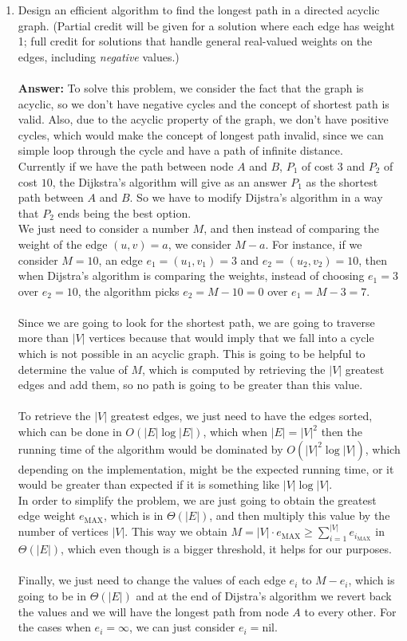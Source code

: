 \documentclass[12pt]{scrartcl}
\begin{document}
\begin{enumerate}
	\item Design an efficient algorithm to find the longest path in a directed acyclic graph. (Partial credit will be given for a solution where each edge has weight 1; full credit for solutions that handle general real-valued weights on the edges, including \textit{negative} values.) \\
	\\
	\textbf{Answer: } To solve this problem, we consider the fact that the graph is acyclic, so we don't have negative cycles and the concept of shortest path is valid. Also, due to the acyclic property of the graph, we don't have positive cycles, which would make the concept of longest path invalid, since we can simple loop through the cycle and have a path of infinite distance. \\
	Currently if we have the path between node $A$ and $B$, $P_1$ of cost $3$ and $P_2$ of cost $10$, the Dijkstra's algorithm will give as an answer $P_1$ as the shortest path between $A$ and $B$. So we have to modify Dijstra's algorithm in a way that $P_2$ ends being the best option. \\
	We just need to consider a number $M$, and then instead of comparing the weight of the edge $(u, v) = a$, we consider $M - a$. For instance, if we consider $M = 10$, an edge $e_1 = (u_1, v_1) = 3$ and $e_2 = (u_2, v_2)  = 10$, then when Dijstra's algorithm is comparing the weights, instead of choosing $e_1 = 3$ over $e_2 = 10$, the algorithm picks $e_2 = M - 10 = 0$ over $e_1 = M - 3 = 7$. \\
	\\
	Since we are going to look for the shortest path, we are going to traverse more than $|V|$ vertices because that would imply that we fall into a cycle which is not possible in an acyclic graph. This is going to be helpful to determine the value of $M$, which is computed by retrieving the $|V|$ greatest edges and add them, so no path is going to be greater than this value. \\
	\\
	To retrieve the $|V|$ greatest edges, we just need to have the edges sorted, which can be done in $O(|E| \log |E|)$, which when $|E| = |V|^2$ then the running time of the algorithm would be dominated by $O(|V|^2 \log |V|)$, which depending on the implementation, might be the expected running time, or it would be greater than expected if it is something like $|V| \log |V|$.\\
	In order to simplify the problem, we are just going to obtain the greatest edge weight $e_{\text{MAX}}$, which is in $\Theta(|E|)$, and then multiply this value by the number of vertices $|V|$. This way we obtain ${\displaystyle M = |V| \cdot e_{\text{MAX}} \ge \sum_{i=1}^{|V|} e_{i_{\text{MAX}}}}$ in $\Theta(|E|)$, which even though is a bigger threshold, it helps for our purposes.\\
	\\
	Finally, we just need to change the values of each edge $e_i$ to $M - e_i$, which is going to be in $\Theta(|E|)$ and at the end of Dijstra's algorithm we revert back the values and we will have the longest path from node $A$ to every other. For the cases when $e_i = \infty$, we can just consider $e_i = \text{nil}$.
	

\end{enumerate}
\end{document}
